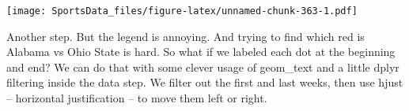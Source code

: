 \documentclass[
]{book}
\newenvironment{Shaded}{\begin{snugshade}}{\end{snugshade}}
\newcommand{\DataTypeTok}[1]{\textcolor[rgb]{0.13,0.29,0.53}{#1}}
\newcommand{\DecValTok}[1]{\textcolor[rgb]{0.00,0.00,0.81}{#1}}
\newcommand{\KeywordTok}[1]{\textcolor[rgb]{0.13,0.29,0.53}{\textbf{#1}}}
\newcommand{\NormalTok}[1]{#1}
\newcommand{\OperatorTok}[1]{\textcolor[rgb]{0.81,0.36,0.00}{\textbf{#1}}}
\newcommand{\StringTok}[1]{\textcolor[rgb]{0.31,0.60,0.02}{#1}}
\begin{document}
\begin{Shaded}
\end{Shaded}

\texttt{[image: SportsData\_files/figure-latex/unnamed-chunk-363-1.pdf]}

Another step. But the legend is annoying. And trying to find which red is Alabama vs Ohio State is hard. So what if we labeled each dot at the beginning and end? We can do that with some clever usage of geom\_text and a little dplyr filtering inside the data step. We filter out the first and last weeks, then use hjust -- horizontal justification -- to move them left or right.
\end{document}
